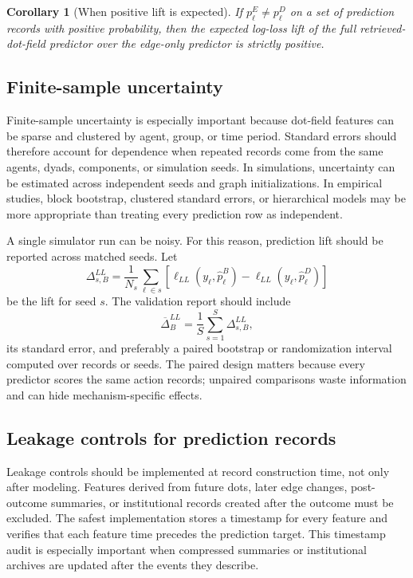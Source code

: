 \documentclass[11pt]{article}
\newtheorem{corollary}{Corollary}
\theoremstyle{remark}
\begin{document}
\begin{corollary}[When positive lift is expected]
If $p_\ell^E\neq p_\ell^D$ on a set of prediction records with positive
probability, then the expected log-loss lift of the full retrieved-dot-field
predictor over the edge-only predictor is strictly positive.
\end{corollary}

\subsection{Finite-sample uncertainty}\label{finite-sample-uncertainty}

Finite-sample uncertainty is especially important because dot-field features can be sparse and clustered by agent, group, or time period. Standard errors should therefore account for dependence when repeated records come from the same agents, dyads, components, or simulation seeds. In simulations, uncertainty can be estimated across independent seeds and graph initializations. In empirical studies, block bootstrap, clustered standard errors, or hierarchical models may be more appropriate than treating every prediction row as independent.


A single simulator run can be noisy. For this reason, prediction lift should be
reported across matched seeds. Let
\[
\Delta_{s,B}^{LL}
=
\frac{1}{N_s}\sum_{\ell\in s}
\left[\ell_{LL}(y_\ell,\widehat p_\ell^B)-
\ell_{LL}(y_\ell,\widehat p_\ell^D)\right]
\]
be the lift for seed $s$. The validation report should include
\[
\overline\Delta_B^{LL}=\frac{1}{S}\sum_{s=1}^{S}\Delta_{s,B}^{LL},
\]
its standard error, and preferably a paired bootstrap or randomization interval
computed over records or seeds. The paired design matters because every
predictor scores the same action records; unpaired comparisons waste
information and can hide mechanism-specific effects.

\subsection{Leakage controls for prediction records}\label{prediction-record-leakage-controls}

Leakage controls should be implemented at record construction time, not only after modeling. Features derived from future dots, later edge changes, post-outcome summaries, or institutional records created after the outcome must be excluded. The safest implementation stores a timestamp for every feature and verifies that each feature time precedes the prediction target. This timestamp audit is especially important when compressed summaries or institutional archives are updated after the events they describe.
\end{document}
